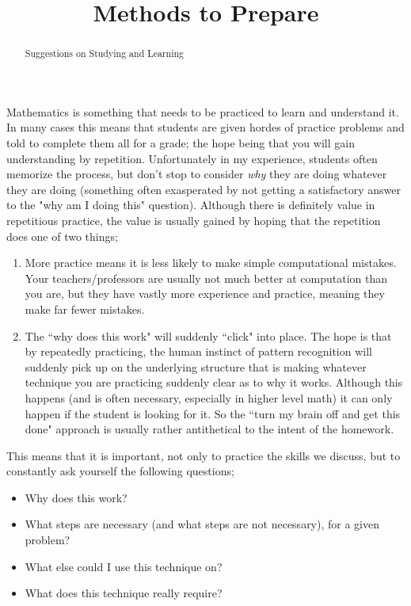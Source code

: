 \documentclass{ximera}
\title{Methods to Prepare}
\begin{document}
\begin{abstract}
Suggestions on Studying and Learning
\end{abstract}
\maketitle


Mathematics is something that needs to be practiced to learn and understand it. In many cases this means that students are given hordes of practice problems and told to complete them all for a grade; the hope being that you will gain understanding by repetition. Unfortunately in my experience, students often memorize the process, but don't stop to consider \textit{why} they are doing whatever they are doing (something often exasperated by not getting a satisfactory answer to the "why am I doing this" question). Although there is definitely value in repetitious practice, the value is usually gained by hoping that the repetition does one of two things;
\begin{enumerate}
\item More practice means it is less likely to make simple computational mistakes. Your teachers/professors are usually not much better at computation than you are, but they have vastly more experience and practice, meaning they make far fewer mistakes.
\item The ``why does this work" will suddenly ``click" into place. The hope is that by repeatedly practicing, the human instinct of pattern recognition will suddenly pick up on the underlying structure that is making whatever technique you are practicing suddenly clear as to why it works. Although this happens (and is often necessary, especially in higher level math) it can only happen if the student is looking for it. So the ``turn my brain off and get this done" approach is usually rather antithetical to the intent of the homework.
\end{enumerate}

This means that it is important, not only to practice the skills we discuss, but to constantly ask yourself the following questions;
\begin{itemize}
    \item Why does this work?
    \item What steps are necessary (and what steps are not necessary), for a given problem?
    \item What else could I use this technique on? 
    \item What does this technique really require?
\end{itemize}
\end{document}
